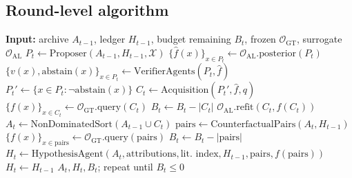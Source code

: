 \documentclass{article}
\begin{document}
\subsection{Round-level algorithm}

\begin{algorithm}
\caption{LEAF closed-loop round (corrected)}
\begin{algorithmic}[1]
\State \textbf{Input:} archive $A_{t-1}$, ledger $H_{t-1}$, budget remaining $B_t$, frozen $\mathcal{O}_{\text{GT}}$, surrogate $\mathcal{O}_{\text{AL}}$
\State $P_t \gets \text{Proposer}(A_{t-1}, H_{t-1}, \mathcal{X})$ 
\State $\{\hat f(x)\}_{x \in P_t} \gets \mathcal{O}_{\text{AL}}.\text{posterior}(P_t)$ 
\State $\{v(x), \text{abstain}(x)\}_{x \in P_t} \gets \text{VerifierAgents}(P_t, \hat f)$ 
\State $P_t' \gets \{x \in P_t : \neg \text{abstain}(x)\}$
\State $C_t \gets \text{Acquisition}(P_t', \hat f, q)$ 
\State $\{f(x)\}_{x \in C_t} \gets \mathcal{O}_{\text{GT}}.\text{query}(C_t)$ 
\State $B_t \gets B_t - |C_t|$
\State $\mathcal{O}_{\text{AL}}.\text{refit}(C_t, f(C_t))$
\State $A_t \gets \text{NonDominatedSort}(A_{t-1} \cup C_t)$
  \State $\text{pairs} \gets \text{CounterfactualPairs}(A_t, H_{t-1})$
  \State $\{f(x)\}_{x \in \text{pairs}} \gets \mathcal{O}_{\text{GT}}.\text{query}(\text{pairs})$ 
  \State $B_t \gets B_t - |\text{pairs}|$
  \State $H_t \gets \text{HypothesisAgent}(A_t, \text{attributions}, \text{lit. index}, H_{t-1}, \text{pairs}, f(\text{pairs}))$
\Else
  \State $H_t \gets H_{t-1}$
\EndIf
\State \Return $A_t, H_t, B_t$; repeat until $B_t \le 0$
\end{algorithmic}
\end{algorithm}
\end{document}
